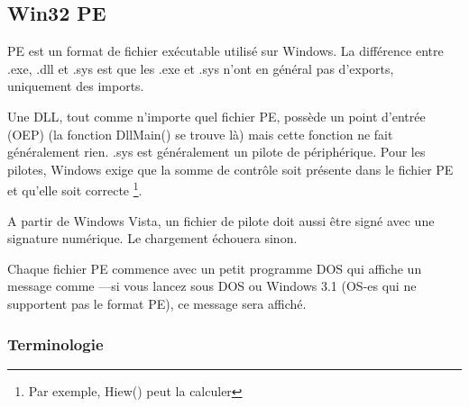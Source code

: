 \subsection{Win32 PE}
\label{win32_pe}

\acs{PE} est un format de fichier exécutable utilisé sur Windows.
La différence entre .exe, .dll et .sys est que les .exe et .sys n'ont en général
pas d'exports, uniquement des imports.


Une \ac{DLL}, tout comme n'importe quel fichier PE, possède un point d'entrée (\ac{OEP})
(la fonction DllMain() se trouve là) mais cette fonction ne fait généralement rien.
.sys est généralement un pilote de périphérique.
Pour les pilotes, Windows exige que la somme de contrôle soit présente dans le fichier
PE et qu'elle soit correcte
\footnote{Par exemple, Hiew() peut la calculer}.

A partir de Windows Vista, un fichier de pilote doit aussi être signé avec une signature
numérique. Le chargement échouera sinon.

Chaque fichier PE commence avec un petit programme DOS qui affiche un message comme
---si vous lancez sous DOS ou
Windows 3.1 (\ac{OS}-es qui ne supportent pas le format PE), ce message sera affiché.

\subsubsection{Terminologie}


